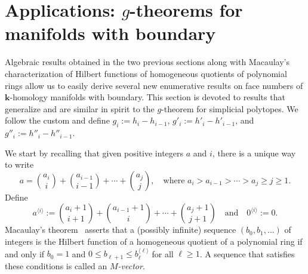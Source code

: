 \documentclass[ALCO,ThmDefs,Unicode,epreuves]{cedram}
\newcommand{\field}{\mathbf{k}}
\begin{document}
\section{Applications: \texorpdfstring{$g$}{g}-theorems for manifolds with boundary}
Algebraic results obtained in the two previous sections along with Macaulay's characterization of Hilbert functions of homogeneous quotients of polynomial rings allow us to easily derive several new enumerative results on face numbers of $\field$-homology manifolds with boundary. This section is devoted to results that generalize and are similar in spirit to the $g$-theorem for simplicial polytopes. We follow the custom and define $g_i:=h_i-h_{i-1}$, $g'_i:=h'_i-h'_{i-1}$, and $g''_i:=h''_i-h''_{i-1}$.

We start by recalling that given positive integers $a$ and $i$, there is a unique way to write
\[
a=\binom{a_i}{i}+\binom{a_{i-1}}{i-1}+\cdots+\binom{a_j}{j}, \quad \mbox{where } a_i>a_{i-1}>\cdots>a_j\geq j\geq 1.
\]
Define
\[a^{\langle i\rangle}:=\binom{a_i+1}{i+1}+\binom{a_{i-1}+1}{i}+\cdots+\binom{a_j+1}{j+1} \quad\mbox{and} \quad 0^{\langle i\rangle}:=0.
\]
Macaulay's theorem~\cite[Theorem~II.2.2]{Stanley-96} asserts that a (possibly infinite) sequence $(b_0, b_1, \ldots)$ of integers is the Hilbert function of a homogeneous quotient of a polynomial ring if and only if $b_0=1$ and $0\leq b_{\ell+1}\leq b_\ell^{\langle \ell\rangle}$ for all $\ell\geq 1$. A sequence that satisfies these conditions is called an \emph{$M$-vector}.
\end{document}
